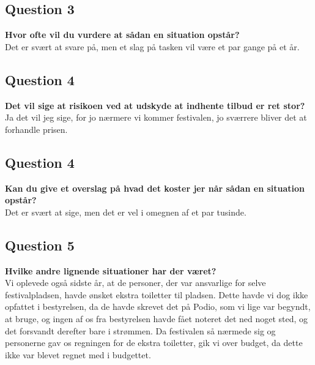 \subsection{Question 3}
\label{i3q4}
\noindent \textbf{Hvor ofte vil du vurdere at sådan en situation opstår?}
\\
Det er svært at svare på, men et slag på tasken vil være et par gange på et år.

\subsection{Question 4}
\label{i3q5}
\noindent \textbf{Det vil sige at risikoen ved at udskyde at indhente tilbud er ret stor?}
\\
Ja det vil jeg sige, for jo nærmere vi kommer festivalen, jo sværrere bliver det at forhandle prisen.

\subsection{Question 4}
\label{i3q5}
\noindent \textbf{Kan du give et overslag på hvad det koster jer når sådan en situation opstår?}
\\
Det er svært at sige, men det er vel i omegnen af et par tusinde.

\subsection{Question 5}
\label{i3q3}
\noindent \textbf{Hvilke andre lignende situationer har der været?}
\\
Vi oplevede også sidste år, at de personer, der var ansvarlige for selve festivalpladsen, havde
ønsket ekstra toiletter til pladsen. Dette havde vi dog ikke opfattet i bestyrelsen, da de havde
skrevet det på Podio, som vi lige var begyndt, at bruge, og ingen af os fra bestyrelsen havde fået
noteret det ned noget sted, og det forsvandt derefter bare i strømmen. Da festivalen så nærmede sig
og personerne gav os regningen for de ekstra toiletter, gik vi over budget, da dette ikke var blevet
regnet med i budgettet.
